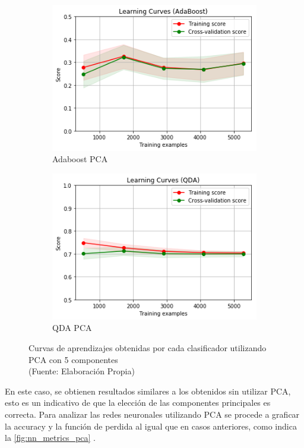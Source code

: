 \begin{figure}[ht!]
\begin{subfigure}{.5\textwidth}
  \centering
  \includegraphics[width=.8\linewidth]{figures/adaboost-PCA.png}
  \caption{Adaboost PCA}
  \label{fig:sub1}
\end{subfigure}%
\begin{subfigure}{.5\textwidth}
  \centering
  \includegraphics[width=.8\linewidth]{figures/qda-PCA.png}
  \caption{QDA PCA}
  \label{fig:sub2}
\end{subfigure}
\caption[Curvas de aprendizajes obtenidas por cada clasificador utilizando PCA]{Curvas de aprendizajes obtenidas por cada clasificador utilizando PCA con 5 componentes\\
{\scriptsize (Fuente: Elaboración Propia)}}
\label{fig:comparativa_clasificadores_pca}
\end{figure}

En este caso, se obtienen resultados similares a los obtenidos sin utilizar PCA, esto es un indicativo de que la elección de las componentes principales es correcta. Para analizar las redes neuronales utilizando PCA se procede a graficar la accuracy y la función de perdida al igual que en casos anteriores, como indica la \autoref{fig:nn_metrics_pca} .

